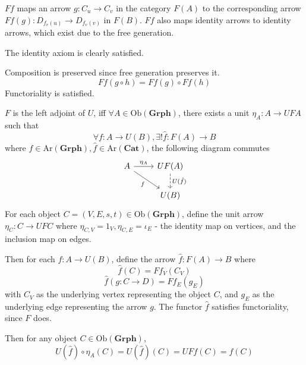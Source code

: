 \documentclass[11pt]{article} %
\theoremstyle{definition}
\theoremstyle{definition}
\theoremstyle{definition}
\begin{document}
$Ff$ maps an arrow $g: C_u\rightarrow C_v$ in the category $F(A)$ 
to the corresponding arrow $Ff(g): D_{f_v(u)} \rightarrow D_{f_v(v)}$ in $F(B)$.
$Ff$ also maps identity arrows to identity arrows, which exist due to the free generation.

The identity axiom is clearly satisfied.

Composition is preserved since free generation preserves it.
\[Ff(g\circ h) = Ff(g) \circ Ff(h)\]
Functoriality is satisfied.

$F$ is the left adjoint of $U$, iff $\forall A\in\text{Ob}(\textbf{Grph})$,
there exists a unit $\eta_A : A\rightarrow UFA$ such that 
\[\forall f: A\rightarrow U(B),\exists! \hat{f}:F(A) \rightarrow B\]
where $f\in\text{Ar}(\textbf{Grph}),\hat{f}\in\text{Ar}(\textbf{Cat})$, the following diagram commutes
\[\begin{tikzcd}
	A & {UF(A)} \\
	& U(B)
	\arrow["{\eta_A}", from=1-1, to=1-2]
	\arrow["{U(\hat{f})}", dashed, from=1-2, to=2-2]
	\arrow["f"', from=1-1, to=2-2]
\end{tikzcd}\]
For each object $C=(V,E,s,t)\in\text{Ob}(\textbf{Grph})$, define the unit arrow $\eta_C : C\rightarrow UFC$
where $\eta_{C,V} = 1_V, \eta_{C,E} = \iota_E$ - the identity map on vertices, and the inclusion map on edges.

Then for each $f: A\rightarrow U(B)$, define the arrow $\hat{f}: F(A) \rightarrow B$ 
where 
\[\hat{f}(C) = Ff_V(C_V)\] 
\[\hat{f}(g:C\rightarrow D) = Ff_E(g_E)\]
with $C_V$ as the underlying vertex representing the object $C$,
and $g_E$ as the underlying edge representing the arrow $g$.
The functor $\hat{f}$ satisfies functoriality, since $F$ does.

Then for any object $C\in\text{Ob}(\textbf{Grph})$, 
\[U(\hat{f})\circ \eta_A(C) = U(\hat{f})(C) = UFf(C) = f(C)\]
\end{document}
